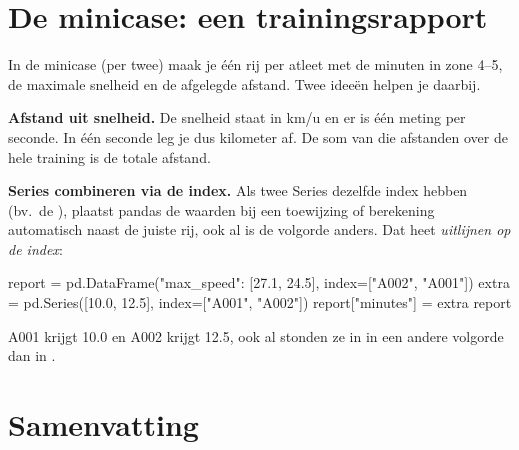 \documentclass[11pt,a4paper]{article}
\begin{document}
\section{De minicase: een trainingsrapport}

In de minicase (per twee) maak je één rij per atleet met de minuten in
zone 4--5, de maximale snelheid en de afgelegde afstand. Twee ideeën
helpen je daarbij.

\textbf{Afstand uit snelheid.} De snelheid staat in km/u en er is één
meting per seconde. In één seconde leg je dus 
kilometer af. De som van die afstanden over de hele training is de totale
afstand.

\textbf{Series combineren via de index.} Als twee Series dezelfde index
hebben (bv.\ de ), plaatst pandas de waarden bij een
toewijzing of berekening automatisch naast de juiste rij, ook al is de
volgorde anders. Dat heet \emph{uitlijnen op de index}:

\begin{python}
report = pd.DataFrame({"max_speed": [27.1, 24.5]}, index=["A002", "A001"])
extra = pd.Series([10.0, 12.5], index=["A001", "A002"])
report["minutes"] = extra
report
\end{python}

A001 krijgt 10.0 en A002 krijgt 12.5, ook al stonden ze in
 in een andere volgorde dan in .

\section{Samenvatting}
\end{document}
